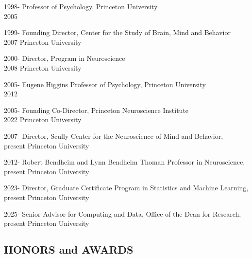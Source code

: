 \documentclass[10 pt]{article}
\begin{document}
1998- \hspace{0.41in} Professor of Psychology, Princeton University
\\2005
    \smallskip

1999- \hspace{0.41in} Founding Director, Center for the Study of Brain, Mind and Behavior
\\2007 \hspace{0.46in} Princeton University
    \smallskip

2000- \hspace{0.41in} Director, Program in Neuroscience
\\2008 \hspace{0.46in} Princeton University
    \smallskip

2005- \hspace{0.41in} Eugene Higgins Professor of Psychology, Princeton University
\\2012
    \smallskip

2005- \hspace{0.41in} Founding Co-Director, Princeton Neuroscience Institute
\\2022 \hspace{0.46in} Princeton University
    \smallskip

2007- \hspace{0.41in} Director, Scully Center for the Neuroscience of Mind and Behavior,
\\present \hspace{0.3in} Princeton University
    \smallskip

2012- \hspace{0.41in} Robert Bendheim and Lynn Bendheim Thoman Professor in Neuroscience,
\\present \hspace{0.3in} Princeton University
    \smallskip

2023- \hspace{0.41in} Director, Graduate Certificate Program in Statistics and Machine Learning,
\\present \hspace{0.3in} Princeton University

2025- \hspace{0.41in} Senior Advisor for Computing and Data, Office of the Dean for Research,
\\present \hspace{0.3in} Princeton University

\newpage


    \begin{center}
\section*{HONORS and AWARDS} \label{secHaA}
    \end{center}
    \vspace{.2in}
\end{document}
